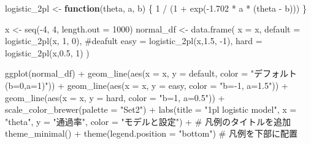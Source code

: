 \documentclass[
  a4paper,
]{ltjsbook}
\newenvironment{Shaded}{\begin{snugshade}}{\end{snugshade}}
\newcommand{\AttributeTok}[1]{\textcolor[rgb]{0.40,0.45,0.13}{#1}}
\newcommand{\CommentTok}[1]{\textcolor[rgb]{0.37,0.37,0.37}{#1}}
\newcommand{\ControlFlowTok}[1]{\textcolor[rgb]{0.00,0.23,0.31}{\textbf{#1}}}
\newcommand{\DecValTok}[1]{\textcolor[rgb]{0.68,0.00,0.00}{#1}}
\newcommand{\FloatTok}[1]{\textcolor[rgb]{0.68,0.00,0.00}{#1}}
\newcommand{\FunctionTok}[1]{\textcolor[rgb]{0.28,0.35,0.67}{#1}}
\newcommand{\NormalTok}[1]{\textcolor[rgb]{0.00,0.23,0.31}{#1}}
\newcommand{\OtherTok}[1]{\textcolor[rgb]{0.00,0.23,0.31}{#1}}
\newcommand{\SpecialCharTok}[1]{\textcolor[rgb]{0.37,0.37,0.37}{#1}}
\newcommand{\StringTok}[1]{\textcolor[rgb]{0.13,0.47,0.30}{#1}}
\begin{document}
\begin{Shaded}
\begin{Highlighting}[]
\NormalTok{logistic\_2pl }\OtherTok{\textless{}{-}} \ControlFlowTok{function}\NormalTok{(theta, a, b) \{}
  \DecValTok{1} \SpecialCharTok{/}\NormalTok{ (}\DecValTok{1} \SpecialCharTok{+} \FunctionTok{exp}\NormalTok{(}\SpecialCharTok{{-}}\FloatTok{1.702} \SpecialCharTok{*}\NormalTok{ a }\SpecialCharTok{*}\NormalTok{ (theta }\SpecialCharTok{{-}}\NormalTok{ b)))}
\NormalTok{\}}

\NormalTok{x }\OtherTok{\textless{}{-}} \FunctionTok{seq}\NormalTok{(}\SpecialCharTok{{-}}\DecValTok{4}\NormalTok{, }\DecValTok{4}\NormalTok{, }\AttributeTok{length.out =} \DecValTok{1000}\NormalTok{)}
\NormalTok{normal\_df }\OtherTok{\textless{}{-}} \FunctionTok{data.frame}\NormalTok{(}
  \AttributeTok{x =}\NormalTok{ x,}
  \AttributeTok{default =} \FunctionTok{logistic\_2pl}\NormalTok{(x, }\DecValTok{1}\NormalTok{, }\DecValTok{0}\NormalTok{), }\CommentTok{\#deafult}
  \AttributeTok{easy =} \FunctionTok{logistic\_2pl}\NormalTok{(x,}\FloatTok{1.5}\NormalTok{, }\SpecialCharTok{{-}}\DecValTok{1}\NormalTok{),}
  \AttributeTok{hard =} \FunctionTok{logistic\_2pl}\NormalTok{(x,}\FloatTok{0.5}\NormalTok{, }\DecValTok{1}\NormalTok{)}
\NormalTok{)}

\FunctionTok{ggplot}\NormalTok{(normal\_df) }\SpecialCharTok{+}
  \FunctionTok{geom\_line}\NormalTok{(}\FunctionTok{aes}\NormalTok{(}\AttributeTok{x =}\NormalTok{ x, }\AttributeTok{y =}\NormalTok{ default, }\AttributeTok{color =} \StringTok{"デフォルト(b=0,a=1)"}\NormalTok{)) }\SpecialCharTok{+}
  \FunctionTok{geom\_line}\NormalTok{(}\FunctionTok{aes}\NormalTok{(}\AttributeTok{x =}\NormalTok{ x, }\AttributeTok{y =}\NormalTok{ easy, }\AttributeTok{color =} \StringTok{"b={-}1, a=1.5"}\NormalTok{)) }\SpecialCharTok{+}
  \FunctionTok{geom\_line}\NormalTok{(}\FunctionTok{aes}\NormalTok{(}\AttributeTok{x =}\NormalTok{ x, }\AttributeTok{y =}\NormalTok{ hard, }\AttributeTok{color =} \StringTok{"b=1, a=0.5"}\NormalTok{)) }\SpecialCharTok{+}
  \FunctionTok{scale\_color\_brewer}\NormalTok{(}\AttributeTok{palette =} \StringTok{"Set2"}\NormalTok{) }\SpecialCharTok{+} 
  \FunctionTok{labs}\NormalTok{(}\AttributeTok{title =} \StringTok{"1pl logistic model"}\NormalTok{,}
       \AttributeTok{x =} \StringTok{"theta"}\NormalTok{,}
       \AttributeTok{y =} \StringTok{"通過率"}\NormalTok{,}
       \AttributeTok{color =} \StringTok{"モデルと設定"}\NormalTok{) }\SpecialCharTok{+}  \CommentTok{\# 凡例のタイトルを追加}
  \FunctionTok{theme\_minimal}\NormalTok{() }\SpecialCharTok{+}
  \FunctionTok{theme}\NormalTok{(}\AttributeTok{legend.position =} \StringTok{"bottom"}\NormalTok{)  }\CommentTok{\# 凡例を下部に配置}
\end{Highlighting}
\end{Shaded}
\end{document}
